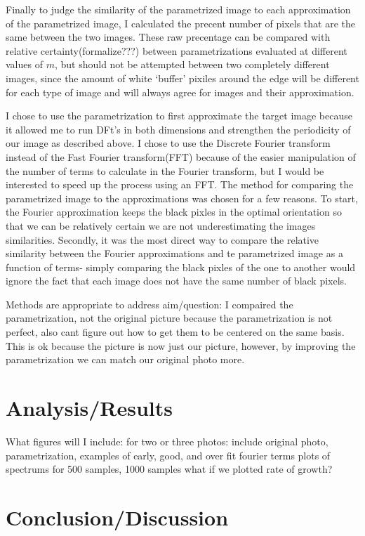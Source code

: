 \documentclass[psamsfonts]{amsart}
\theoremstyle{definition}
\theoremstyle{remark}
\numberwithin{equation}{section}
\begin{document}
Finally to judge the similarity of the parametrized image to each approximation of the parametrized image, I calculated the precent number of pixels that are the same between the two images. These raw precentage can be compared with relative certainty(formalize???) between parametrizations evaluated at different values of $m$, but should not be attempted between two completely different images, since the amount of white `buffer' pixiles around the edge will be different for each type of image and will always agree for images and their approximation. 
 
I chose to use the parametrization to first approximate the target image because it allowed me to run DFt's in both dimensions and strengthen the periodicity of our image as described above. I chose to use the Discrete Fourier transform instead of the Fast Fourier transform(FFT) because of the easier manipulation of the number of terms to calculate in the Fourier transform, but I would be interested to speed up the process using an FFT. The method for comparing the parametrized image to the approximations was chosen for a few reasons. To start, the Fourier approximation keeps the black pixles in the optimal orientation so that we can be relatively certain we are not underestimating the images similarities. Secondly, it was the most direct way to compare the relative similarity between the Fourier approximations and te parametrized image as a function of terms- simply comparing the black pixles of the one to another would ignore the fact that each image does not have the same number of black pixels.

 Methods are appropriate to address aim/question:
 	 I compaired the parametrization, not the original picture because the parametrization is not perfect, also cant figure out how to get them to be centered on the same basis. This is ok because the picture is now just our picture, however, by improving the parametrization we can match our original photo more.
 	

 
 \section{Analysis/Results}
 	What figures will I include:
 	for two or three photos:
 	include original photo, parametrization,
 	examples of early, good, and over fit fourier terms
 	plots of spectrums for 500 samples, 1000 samples
 	what if we plotted rate of growth?
 \section{Conclusion/Discussion}
 
\end{document}
